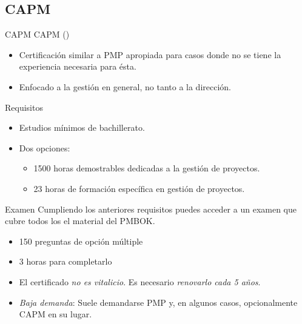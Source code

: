 \subsection{CAPM}

\begin{frame}[allowframebreaks]{CAPM}
	CAPM ()
	\begin{itemize}
		\item Certificación similar a PMP apropiada para casos donde no se tiene la experiencia necesaria para ésta.
		
		\item Enfocado a la gestión en general, no tanto a la dirección.
	\end{itemize}
	
	\begin{block}{Requisitos}
		\begin{itemize}
			\item Estudios mínimos de bachillerato.
			\item Dos opciones:
			\begin{itemize}
				\item 1500 horas demostrables dedicadas a la gestión de proyectos.
				\item 23 horas de formación específica en gestión de proyectos.
			\end{itemize}
		\end{itemize}
	\end{block}
	
	\framebreak
	
	\begin{block}{Examen}
		Cumpliendo los anteriores requisitos puedes acceder a un examen que cubre todos los el material del PMBOK.
		\begin{itemize}
		\item 150 preguntas de opción múltiple
		\item 3 horas para completarlo
		\end{itemize}
	\end{block}
	
	\begin{itemize}
		\item El certificado \emph{no es vitalicio}. Es necesario \emph{renovarlo cada 5 años}.
		
		\item \emph{Baja demanda}: Suele demandarse PMP y, en algunos casos, opcionalmente CAPM en su lugar.
	\end{itemize}
\end{frame}